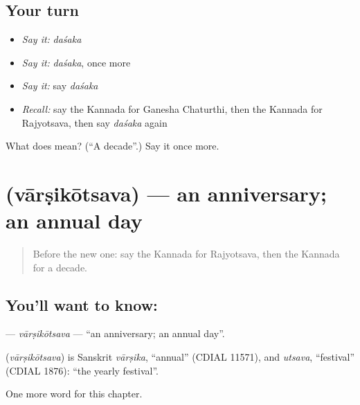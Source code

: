 \subsection*{Your turn}
\begin{itemize}
\raggedright
  \item \emph{Say it:} \emph{daśaka}
  \item \emph{Say it:} \emph{daśaka}, once more
  \item \emph{Say it:} say \emph{daśaka}
  \item \emph{Recall:} say the Kannada for Ganesha Chaturthi, then the Kannada for Rajyotsava, then say \emph{daśaka} again
\end{itemize}

\begin{tcolorbox}[breakable,colback=teal!4,colframe=teal!35!black,title={Before you move on}]
What does  mean? (\textquotedblleft{}A decade\textquotedblright{}.) Say it once more.
\end{tcolorbox}
\section[\texorpdfstring{\kn{ವಾರ್ಷಿಕೋತ್ಸವ} (vārṣikōtsava)}{ವಾರ್ಷಿಕೋತ್ಸವ (vārṣikōtsava)}]{ (vārṣikōtsava) — an anniversary; an annual day}

\label{lesson:KA-C248-varsikotsava}



\begin{quote}
Before the new one: say the Kannada for Rajyotsava, then the Kannada for a decade.
\end{quote}

\subsection*{You'll want to know: }
\textbf{} — \emph{vārṣikōtsava} — \textquotedblleft{}an anniversary; an annual day\textquotedblright{}.

\begin{cousinweb}
\textbf{} (\emph{vārṣikōtsava}) is Sanskrit \emph{vārṣika}, \textquotedblleft{}annual\textquotedblright{} (CDIAL 11571), and \emph{utsava}, \textquotedblleft{}festival\textquotedblright{} (CDIAL 1876): \textquotedblleft{}the yearly festival\textquotedblright{}.
\end{cousinweb}

\begin{grammarlens}[title={What you've built}]
One more word for this chapter.
\end{grammarlens}

